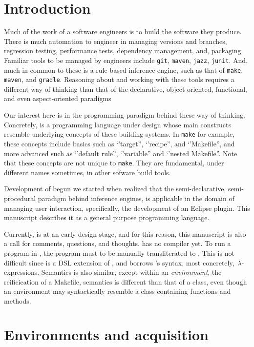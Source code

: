 \section{Introduction}
\newcommand\zz[1]{\texttt{#1}}

Much of the work of a software engineers is to build the software they produce.
There is much automation to engineer in managing versions and branches,
regression testing, performance tests, dependency management, and, packaging.
Familiar tools to be managed by engineers include 
\zz{git}, \zz{maven}, \zz{jazz}, \zz{junit}. And, much in common to these is a
rule based inference engine, such as that of \zz{make}, \zz{maven}, and
\zz{gradle}. Reasoning about and working with these tools requires a different
way of thinking than that of the declarative, object oriented, functional, and
even aspect-oriented paradigms

Our interest here is in the programming paradigm behind these way of thinking.
Concretely, \Reap is a programming language under design whose main constructs
resemble underlying concepts of these building systems. In \zz{make} for
example, these concepts include basics such as `'target”, `'recipe”, and
`'Makefile”, and more advanced such as `'default rule”, `'variable” and `'nested
Makefile”. Note that these concepts are not unique to \zz{make}. They are
fundamental, under different names sometimes, in other sofware build tools.

Development of \Reap begun we started when realized that the semi-declarative,
semi-procedural paradigm behind inference engines, is applicable in the domain
of managing user interaction, specifically, the development of an Eclipse
plugin. This manuscript describes it as a general purpose programming language.

Currently, \Reap is at an early design stage, and for this reason, this
manuscript is also a call for comments, questions, and thoughts. \Reap has no
compiler yet. To run a program in \Reap, the program must to be manually
transliterated to \Java. This is not difficult since \Reap is a DSL extension
of \Java, and borrows \Java's syntax, most concretely,~$λ$-expressions.
Semantics is also similar, except within an \emph{environment}, the \Reap
reificication of a Makefile, semantics is different than that of a \Java class,
even though an environment may syntactically resemble a class containing
functions and methods.

\section{Environments and acquisition}

